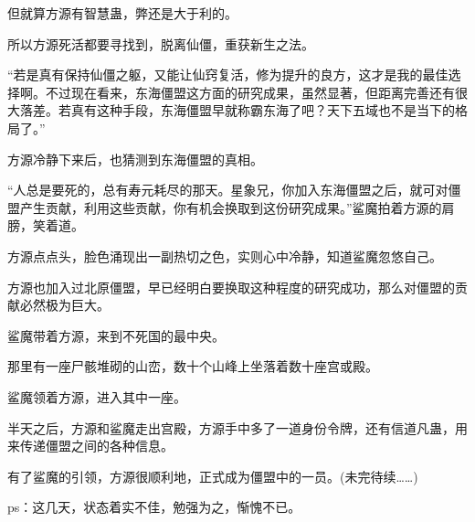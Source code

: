 \begin{this_body}
但就算方源有智慧蛊，弊还是大于利的。

所以方源死活都要寻找到，脱离仙僵，重获新生之法。

“若是真有保持仙僵之躯，又能让仙窍复活，修为提升的良方，这才是我的最佳选择啊。不过现在看来，东海僵盟这方面的研究成果，虽然显著，但距离完善还有很大落差。若真有这种手段，东海僵盟早就称霸东海了吧？天下五域也不是当下的格局了。”

方源冷静下来后，也猜测到东海僵盟的真相。

“人总是要死的，总有寿元耗尽的那天。星象兄，你加入东海僵盟之后，就可对僵盟产生贡献，利用这些贡献，你有机会换取到这份研究成果。”鲨魔拍着方源的肩膀，笑着道。

方源点点头，脸色涌现出一副热切之色，实则心中冷静，知道鲨魔忽悠自己。

方源也加入过北原僵盟，早已经明白要换取这种程度的研究成功，那么对僵盟的贡献必然极为巨大。

鲨魔带着方源，来到不死国的最中央。

那里有一座尸骸堆砌的山峦，数十个山峰上坐落着数十座宫或殿。

鲨魔领着方源，进入其中一座。

半天之后，方源和鲨魔走出宫殿，方源手中多了一道身份令牌，还有信道凡蛊，用来传递僵盟之间的各种信息。

有了鲨魔的引领，方源很顺利地，正式成为僵盟中的一员。(未完待续……)

ps：这几天，状态着实不佳，勉强为之，惭愧不已。

\end{this_body}

